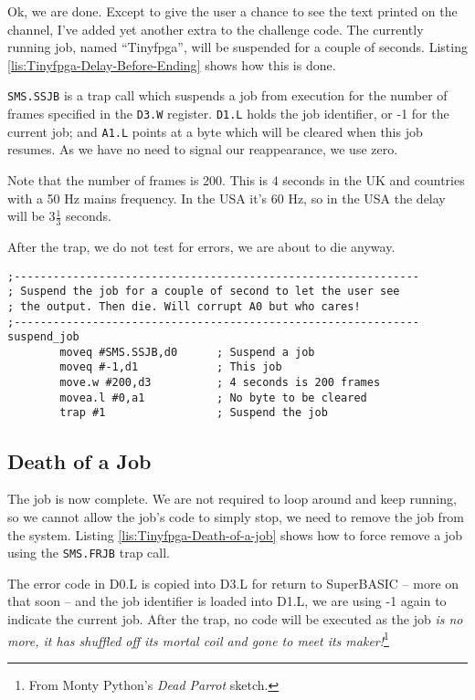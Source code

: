 Ok, we are done. Except to give the user a chance to see the text
printed on the channel, I've added yet another extra to the challenge
code. The currently running job, named ``Tinyfpga'', will be suspended
for a couple of seconds. Listing \ref{lis:Tinyfpga-Delay-Before-Ending}
shows how this is done.

\texttt{SMS.SSJB} is a trap call which suspends a job from execution
for the number of frames specified in the \texttt{D3.W} register.
\texttt{D1.L} holds the job identifier, or -1 for the current job;
and \texttt{A1.L} points at a byte which will be cleared when this
job resumes. As we have no need to signal our reappearance, we use
zero.

Note that the number of frames is 200. This is $4$ seconds in the
UK and countries with a 50 Hz mains frequency. In the USA it's 60
Hz, so in the USA the delay will be $3\frac{1}{3}$ seconds.

After the trap, we do not test for errors, we are about to die anyway.

\begin{lstlisting}[caption={Tinyfpga - Delay Before Ending},label={lis:Tinyfpga-Delay-Before-Ending}]
;--------------------------------------------------------------
; Suspend the job for a couple of second to let the user see
; the output. Then die. Will corrupt A0 but who cares!
;--------------------------------------------------------------
suspend_job
        moveq #SMS.SSJB,d0      ; Suspend a job
        moveq #-1,d1            ; This job
        move.w #200,d3          ; 4 seconds is 200 frames
        movea.l #0,a1           ; No byte to be cleared
        trap #1                 ; Suspend the job

\end{lstlisting}


\subsection{Death of a Job}

The job is now complete. We are not required to loop around and keep
running, so we cannot allow the job's code to simply stop, we need
to remove the job from the system. Listing \ref{lis:Tinyfpga-Death-of-a-job}
shows how to force remove a job using the \texttt{SMS.FRJB} trap call.

The error code in D0.L is copied into D3.L for return to SuperBASIC
-- more on that soon -- and the job identifier is loaded into D1.L,
we are using -1 again to indicate the current job. After the trap,
no code will be executed as the job \emph{is no more, it has shuffled
off its mortal coil and gone to meet its maker!}\footnote{From Monty Python's \emph{Dead Parrot} sketch.}

